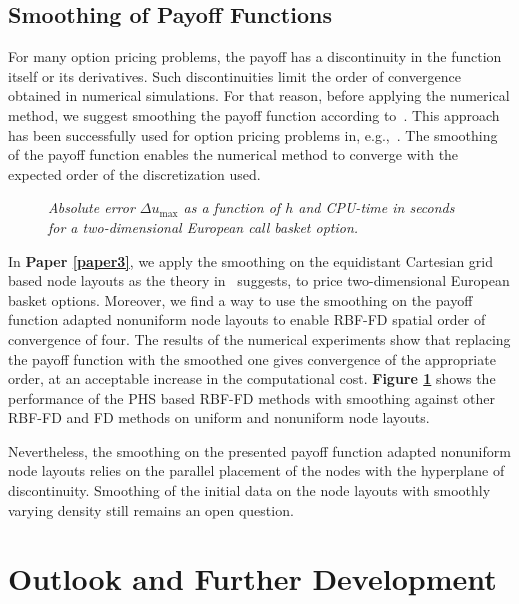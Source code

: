 \documentclass{UUThesisTemplate}
\begin{document}
%
\section{Smoothing of Payoff Functions}

\par
For many option pricing problems, the payoff has a discontinuity in the function itself or its derivatives. Such discontinuities limit the order of convergence obtained in numerical simulations. For that reason, before applying the numerical method, we suggest smoothing the payoff function according to~\cite{kreiss1970smoothing}. This approach has been successfully used for option pricing problems in, e.g.,~\cite{pooley2003convergence, during2015high}. The smoothing of the payoff function enables the numerical method to converge with the expected order of the discretization used. 

\begin{figure}[H]
\centering
\hspace{11pt}

\caption{\emph{Absolute error $\Delta u_{\max}$ as a function of $h$ and CPU-time in seconds for a two-dimensional European call basket option.}}
\label{fig:smoothing}
\end{figure}

\par
In \textbf{Paper \ref{paper3}}, we apply the smoothing on the equidistant Cartesian grid based node layouts as the theory in~\cite{kreiss1970smoothing} suggests, to price two-dimensional European basket options. Moreover, we find a way to use the smoothing on the payoff function adapted nonuniform node layouts to enable RBF-FD spatial order of convergence of four. The results of the numerical experiments show that replacing the payoff function with the smoothed one gives convergence of the appropriate order, at an acceptable increase in the computational cost. \textbf{Figure \ref{fig:smoothing}} shows the performance of the PHS based RBF-FD methods with smoothing against other RBF-FD and FD methods on uniform and nonuniform node layouts. 

\par
Nevertheless, the smoothing on the presented payoff function adapted nonuniform node layouts relies on the parallel placement of the nodes with the hyperplane of discontinuity. Smoothing of the initial data on the node layouts with smoothly varying density still remains an open question. 


%
\chapter{Outlook and Further Development}
\label{ch:outlook}
\end{document}
